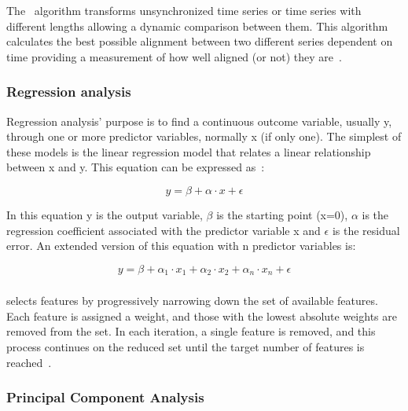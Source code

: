 The~ algorithm transforms unsynchronized time series or time series with different lengths allowing a dynamic comparison between them. This algorithm calculates 
the best possible alignment between two different series dependent on time providing a measurement of how well aligned (or not) they are~\cite{bachelorInsole}.

\subsubsection{Regression analysis}
\label{sssec:regression_analysis}

Regression analysis' purpose is to find a continuous outcome variable, usually y, through one or more predictor variables, normally x (if only one). The simplest of these models is the 
linear regression model that relates a linear relationship between x and y. This equation can be expressed as~\cite{bachelorInsole}:

\begin{equation}
  y = \beta + \alpha \cdot x + \epsilon
  \label{eq:regAnalEQ}
\end{equation}

In this equation y is the output variable, $\beta$ is the starting point (x=0), $\alpha$ is the regression coefficient associated with the predictor variable x and $\epsilon$ is the residual error.
An extended version of this equation with n predictor variables is:

\begin{equation}
  y = \beta + \alpha_1 \cdot x_1 + \alpha_2 \cdot x_2 + \alpha_n \cdot x_n + \epsilon
  \label{eq:regAnalEQGeneral}
\end{equation}


\subsubsection{}
\label{sssec:recursive_feature_elimination}

 selects features by progressively narrowing down the set of available features. Each feature is assigned a weight, and those with the lowest absolute 
weights are removed from the set. In each iteration, a single feature is removed, and this process continues on the reduced set until the target number of features is reached~\cite{porto}.


\subsubsection{Principal Component Analysis}
\label{sssec:principal_component_analysis}

